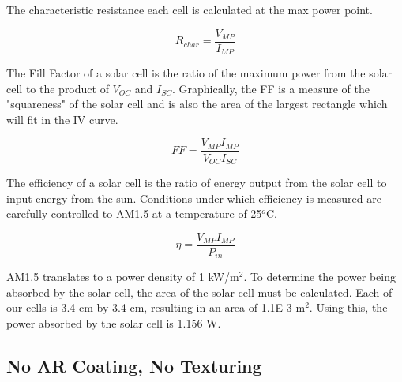\documentclass[letter,12pt]{article}
\begin{document}
	The characteristic resistance each cell is calculated at the max power point.

	\begin{equation}
		R_{char} = \frac{V_{MP}}{I_{MP}}
	\end{equation}
	
	The Fill Factor of a solar cell is the ratio of the maximum power from the solar cell to the product of $V_{OC}$ and $I_{SC}$. Graphically, the FF is a measure of the "squareness" of the solar cell and is also the area of the largest rectangle which will fit in the IV curve.
	
	\begin{equation}
		FF = \frac{V_{MP} I_{MP}}{V_{OC} I_{SC}}
	\end{equation}
	
	The efficiency of a solar cell is the ratio of energy output from the solar cell to input energy from the sun.  Conditions under which efficiency is measured are carefully controlled to AM1.5 at a temperature of 25$^o$C.
	
	\begin{equation}
		\eta = \frac{V_{MP} I_{MP}}{P_{in}}
	\end{equation}

	AM1.5 translates to a power density of 1 kW/m$^2$. To determine the power being absorbed by the solar cell, the area of the solar cell must be calculated.  Each of our cells is 3.4 cm by 3.4 cm, resulting in an area of 1.1{\scriptsize E}-3 m$^2$. Using this, the power absorbed by the solar cell is 1.156 W.
	
	\pagebreak
	\FloatBarrier
	\subsection{No AR Coating, No Texturing}
	
\end{document}
